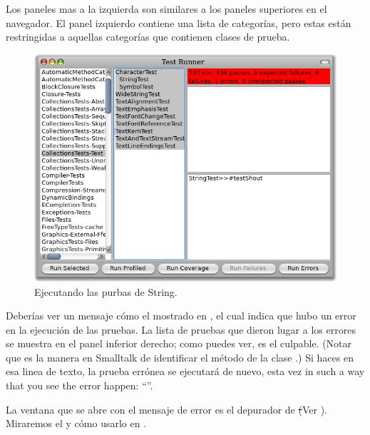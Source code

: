 \documentclass[a4paper,10pt,twoside]{book}
\begin{document}
Los paneles mas a la izquierda son similares a los paneles superiores en el navegador. El panel izquierdo contiene una lista de categor\'ias, pero estas est\'an restringidas a aquellas categor\'ias que contienen clases de prueba.


\begin{figure}[hbt]
\centerline {\includegraphics[width=\textwidth]{testRunnerOnStringTest}}
\caption{Ejecutando las purbas de String.
}
\end{figure}

Deber\'ias ver un mensaje c\'omo el mostrado en , el cual indica que hubo un error en la ejecuci\'on de las pruebas. La lista de pruebas que dieron lugar a los errores se muestra en el panel inferior derecho; como puedes ver,  es el culpable.
(Notar que  es la manera en Smalltalk de identificar el m\'etodo  de la clase .)
Si haces \click en esa linea de texto, la prueba err\'onea se ejecutar\'a de nuevo, esta vez in such a way that you see the error happen: ``''.

La ventana que se abre con el mensaje de error es el depurador de \st (Ver ).
Miraremos el  y c\'omo usarlo en .
\end{document}
